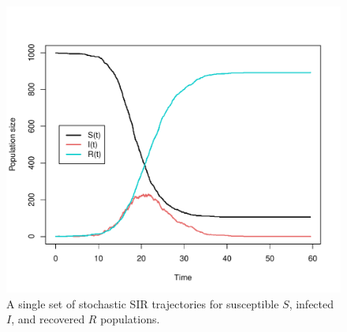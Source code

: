\documentclass[12pt,titlepage]{article}
\begin{document}

%
%
\begin{figure}
    \begin{center}
    	\includegraphics[width=6in]{figure1.pdf}
    \end{center}
    \caption{A single set of stochastic SIR trajectories for
      susceptible $S$, infected $I$, and recovered $R$ populations.}
	\label{fig:SIRRh_traj}
\end{figure}
%
\end{document}
